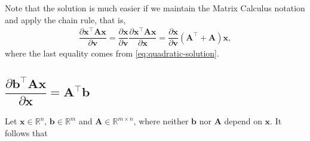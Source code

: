 \documentclass{article}
\newcommand{\trans}{\top}
\begin{document}
Note that the solution is much easier if we maintain the Matrix Calculus notation and apply the chain rule, that is,
\begin{align}
    \dfrac{\partial \mathbf{x}^\trans \mathbf{A} \mathbf{x}}{\partial \mathbf{v}} = \dfrac{\partial \mathbf{x}}{\partial \mathbf{v}} \dfrac{\partial \mathbf{x}^\trans \mathbf{A} \mathbf{x}}{\partial \mathbf{x}} = \dfrac{\partial \mathbf{x}}{\partial \mathbf{v}} \left(\mathbf{A}^\trans + \mathbf{A}\right) \mathbf{x},
\end{align}
where the last equality comes from \eqref{eq:quadratic-solution}.

\subsection{\(\dfrac{\partial \mathbf{b}^\trans \mathbf{A} \mathbf{x}}{\partial \mathbf{x}} = \mathbf{A}^\trans \mathbf{b}\)} \label{sec:bt-A-x}
Let \(\mathbf{x} \in \mathbb{R}^{n}\), \(\mathbf{b} \in \mathbb{R}^{m}\) and \(\mathbf{A}\in \mathbb{R}^{m\times n}\), where neither \(\mathbf{b}\) nor \(\mathbf{A}\) depend on \(\mathbf{x}\). It follows that
\end{document}
